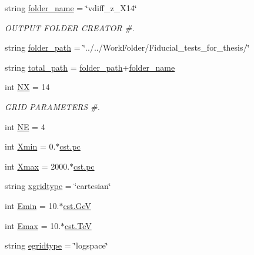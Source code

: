 \begin{DoxyCompactItemize}
\item 
string \hyperlink{namespacenamelist__vdiff_a39763c29a287e42f404c27bcd47325ce}{folder\+\_\+name} = \char`\"{}vdiff\+\_\+z\+\_\+\+X14\char`\"{}
\begin{DoxyCompactList}\small\item\em O\+U\+T\+P\+UT F\+O\+L\+D\+ER C\+R\+E\+A\+T\+OR \#. \end{DoxyCompactList}\item 
string \hyperlink{namespacenamelist__vdiff_a71b64d0fbe9ace4295b1a38edf62f35f}{folder\+\_\+path} = \char`\"{}../../Work\+Folder/Fiducial\+\_\+tests\+\_\+for\+\_\+thesis/\char`\"{}
\item 
string \hyperlink{namespacenamelist__vdiff_a83da4807ccfedab13b6460a0d98ea96d}{total\+\_\+path} = \hyperlink{namespacenamelist__vdiff_a71b64d0fbe9ace4295b1a38edf62f35f}{folder\+\_\+path}+\hyperlink{namespacenamelist__vdiff_a39763c29a287e42f404c27bcd47325ce}{folder\+\_\+name}
\item 
int \hyperlink{namespacenamelist__vdiff_af6ec91586df3039ffa567113499f5f0c}{NX} = 14
\begin{DoxyCompactList}\small\item\em G\+R\+ID P\+A\+R\+A\+M\+E\+T\+E\+RS \#. \end{DoxyCompactList}\item 
int \hyperlink{namespacenamelist__vdiff_a35160199f7eeb6d25fdf0832dbebf373}{NE} = 4
\item 
int \hyperlink{namespacenamelist__vdiff_abca97361a0eed05f691f780900b95d01}{Xmin} = 0.$\ast$\hyperlink{constants_8h_a2884cd030c4c825754349a525a1d06ce}{cst.\+pc}
\item 
int \hyperlink{namespacenamelist__vdiff_a7cd8a3edb14ea27a804141f3e858ed3e}{Xmax} = 2000.$\ast$\hyperlink{constants_8h_a2884cd030c4c825754349a525a1d06ce}{cst.\+pc}
\item 
string \hyperlink{namespacenamelist__vdiff_a5fd5475a8aa194902c13a1f79b3ba050}{xgridtype} = \char`\"{}cartesian\char`\"{}
\item 
int \hyperlink{namespacenamelist__vdiff_a35d8a695963d790f4b41bc64e5fc2e79}{Emin} = 10.$\ast$\hyperlink{constants_8h_aec0e126d9991db8ad0b26139f5860568}{cst.\+GeV}
\item 
int \hyperlink{namespacenamelist__vdiff_a1d11027ceca7080d56390756c58de24a}{Emax} = 10.$\ast$\hyperlink{constants_8h_a7f801e1f6821bc6baf0652ed2496e5e9}{cst.\+TeV}
\item 
string \hyperlink{namespacenamelist__vdiff_acec5111fb715636887d0bbfd3d160269}{egridtype} = \char`\"{}logspace\char`\"{}

\end{DoxyCompactItemize}

